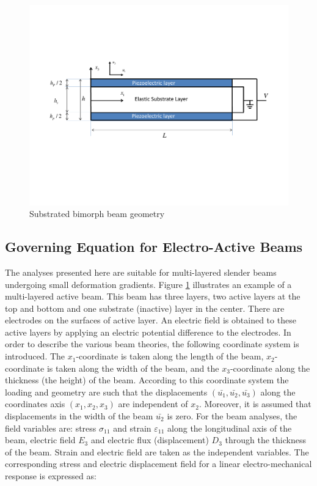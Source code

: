 \begin{figure}
\centering
\includegraphics[width=6.0in]{./chap_4_structural_analyses/pdf_beam/PVDF_beam_geometry.pdf}
\caption{Substrated bimorph beam geometry}
\label{fig:PVDF_beam_geometry}
\end{figure}

\subsection{Governing Equation for Electro-Active Beams}
The analyses presented here are suitable for multi-layered slender beams undergoing small deformation gradients.
Figure \ref{fig:PVDF_beam_geometry} illustrates an example of a multi-layered active beam.
This beam has three layers, two active layers at the top and bottom and one substrate (inactive) layer in the center.
There are electrodes on the surfaces of active layer.
An electric field is obtained to these active layers by applying an electric potential difference to the electrodes.
In order to describe the various beam theories, the following coordinate system is introduced.
The
 $x_1$-coordinate is taken along the length of the beam,
 $x_2$-coordinate is taken along the width of the beam, and the
 $x_3$-coordinate along the thickness (the height) of the beam.
According to this coordinate system the loading and geometry are such that the displacements
 $(\bar {u_1}, \bar {u_2}, \bar {u_3})$ along the coordinates axis
 $( {x_1}, {x_2},  {x_3})$ are independent of $x_2$.
Moreover, it is assumed that displacements in the width of the beam $\bar {u_2}$ is zero.
For the beam analyses, the field variables are:
stress $\sigma_{11}$ and
strain $\varepsilon_{11}$ along the longitudinal axis of the beam,
electric field $E_3$ and electric flux (displacement) $D_3$ through the thickness of the beam.
Strain and electric field are taken as the independent variables.
The corresponding stress and electric displacement field for a linear electro-mechanical response is expressed as:

